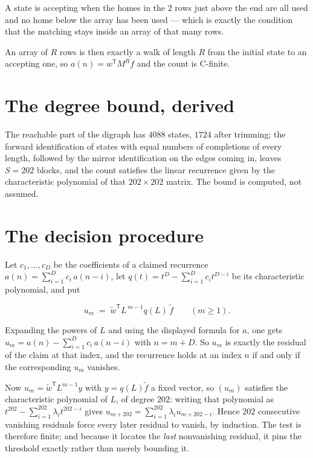 \documentclass[11pt]{article}
\theoremstyle{definition}
\begin{document}
A state is accepting when the homes in the $2$ rows just above the end are all used and no home below the array has been used --- which is exactly the condition that the matching stays inside an array of that many rows.

An array of $R$ rows is then exactly a walk of length $R$ from the initial state to an accepting one, so $a(n) = w^{\mathsf T}M^{R}f$ and the count is C-finite.

\section{The degree bound, derived}

The reachable part of the digraph has $4088$ states, $1724$ after trimming; the forward identification of states with equal numbers of completions of every length, followed by the mirror identification on the edges coming in, leaves $S = 202$ blocks, and the count satisfies the linear recurrence given by the characteristic polynomial of that $202\times202$ matrix. The bound is computed, not assumed.

\section{The decision procedure}

Let $c_1,\dots,c_D$ be the coefficients of a claimed recurrence $a(n) = \sum_{i=1}^{D} c_i\,a(n-i)$, let $q(t) = t^{D} - \sum_{i=1}^{D} c_i t^{D-i}$ be its characteristic polynomial, and put

\[u_m \;=\; \tilde w^{\mathsf T} L^{\,m-1} q(L)\,\tilde f \qquad (m \ge 1).\]

Expanding the powers of $L$ and using the displayed formula for $a$, one gets $u_m = a(n) - \sum_{i=1}^{D} c_i\,a(n-i)$ with $n = m + D$. So $u_m$ is exactly the residual of the claim at that index, and the recurrence holds at an index $n$ if and only if the corresponding $u_m$ vanishes.

Now $u_m = \tilde w^{\mathsf T} L^{m-1} y$ with $y = q(L)\tilde f$ a fixed vector, so $(u_m)$ satisfies the characteristic polynomial of $L$, of degree $202$: writing that polynomial as $t^{202} - \sum_{i=1}^{202} \lambda_i t^{202-i}$ gives $u_{m+202} = \sum_{i=1}^{202} \lambda_i u_{m+202-i}$. Hence $202$ consecutive vanishing residuals force every later residual to vanish, by induction. The test is therefore finite; and because it locates the {\itshape last} nonvanishing residual, it pins the threshold exactly rather than merely bounding it.
\end{document}
